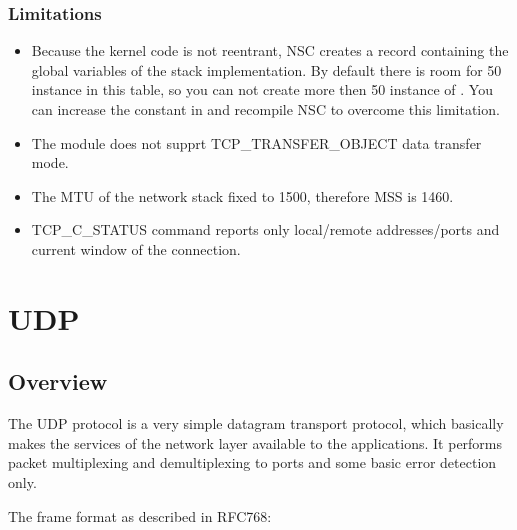 \subsubsection*{Limitations}

\begin{itemize}
\item Because the kernel code is not reentrant, NSC creates a record containing
the global variables of the stack implementation. By default there is room
for 50 instance in this table, so you can not create more then 50 instance
of . You can increase the  constant
in  and recompile NSC to overcome this limitation.

\item The  module does not supprt TCP\_TRANSFER\_OBJECT
data transfer mode.

\item The MTU of the network stack fixed to 1500, therefore MSS is 1460.

\item TCP\_C\_STATUS command reports only local/remote addresses/ports and
      current window of the connection.

\end{itemize}






\section{UDP}
\label{sec:udp}

\subsection{Overview}

The UDP protocol is a very simple datagram transport protocol, which
basically makes the services of the network layer available to the applications.
It performs packet multiplexing and demultiplexing to ports and some basic
error detection only.

The frame format as described in RFC768:

